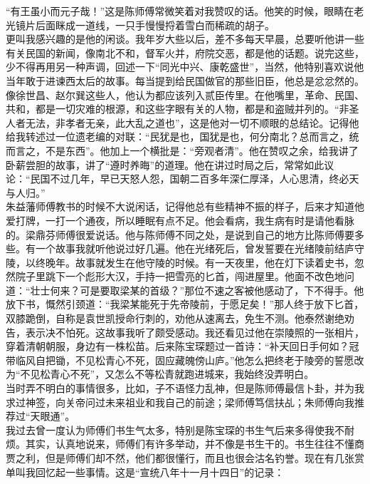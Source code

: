 “有王虽小而元子哉！”这是陈师傅常微笑着对我赞叹的话。他笑的时候，眼睛在老光镜片后面眯成一道线，一只手慢慢捋着雪白而稀疏的胡子。\\

更叫我感兴趣的是他的闲谈。我年岁大些以后，差不多每天早晨，总要听他讲一些有关民国的新闻，像南北不和，督军火并，府院交恶，都是他的话题。说完这些，少不得再用另一种声调，回述一下“同光中兴、康乾盛世”，当然，他特别喜欢说他当年敢于进谏西太后的故事。每当提到给民国做官的那些旧臣，他总是忿忿然的。像徐世昌、赵尔巽这些人，他认为都应该列入贰臣传里。在他嘴里，革命、民国、共和，都是一切灾难的根源，和这些字眼有关的人物，都是和盗贼并列的。“非圣人者无法，非孝者无亲，此大乱之道也”，这是他对一切不顺眼的总结论。记得他给我转述过一位遗老编的对联：“民犹是也，国犹是也，何分南北？总而言之，统而言之，不是东西”。他加上一个横批是：“旁观者清”。他在赞叹之余，给我讲了卧薪尝胆的故事，讲了“遵时养晦”的道理。他在讲过时局之后，常常如此议论：“民国不过几年，早已天怒人怨，国朝二百多年深仁厚泽，人心思清，终必天与人归。”\\

朱益藩师傅教书的时候不大说闲话，记得他总有些精神不振的样子，后来才知道他爱打牌，一打一个通夜，所以睡眠有点不足。他会看病，我生病有时是请他看脉的。梁鼎芬师傅很爱说话。他与陈师傅不同之处，是说到自己的地方比陈师傅要多些。有一个故事我就听他说过好几遍。他在光绪死后，曾发誓要在光绪陵前结庐守陵，以终晚年。故事就发生在他守陵的时候。有一天夜里，他在灯下读着史书，忽然院子里跳下一个彪形大汉，手持一把雪亮的匕首，闯进屋里。他面不改色地问道：“壮士何来？可是要取梁某的首级？”那位不速之客被他感动了，下不得手。他放下书，慨然引颈道：“我梁某能死于先帝陵前，于愿足矣！”那人终于放下匕首，双膝跪倒，自称是袁世凯授命行刺的，劝他从速离去，免生不测。他泰然谢绝劝告，表示决不怕死。这故事我听了颇受感动。我还看见过他在崇陵照的一张相片，穿着清朝朝服，身边有一株松苗。后来陈宝琛题过一首诗：“补天回日手何如？冠带临风自把锄，不见松青心不死，固应藏魄傍山庐。”他怎么把终老于陵旁的誓愿改为“不见松青心不死”，又怎么不等松青就跑进城来，我始终没弄明白。\\

当时弄不明白的事情很多，比如，子不语怪力乱神，但是陈师傅最信卜卦，并为我求过神签，向关帝问过未来祖业和我自己的前途；梁师傅笃信扶乩；朱师傅向我推荐过“天眼通”。\\

我过去曾一度认为师傅们书生气太多，特别是陈宝琛的书生气后来多得使我不耐烦。其实，认真地说来，师傅们有许多举动，并不像是书生干的。书生往往不懂商贾之利，但是师傅们却不然，他们都很懂行，而且也很会沽名钓誉。现在有几张赏单叫我回忆起一些事情。这是“宣统八年十一月十四日”的记录：\\


